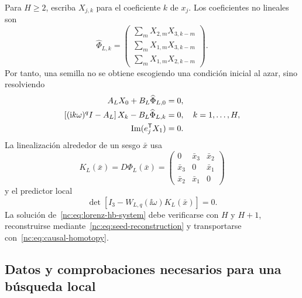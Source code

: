 Para \(H\geq2\), escriba \(X_{j,k}\) para el coeficiente \(k\) de \(x_j\).
Los coeficientes no lineales son
\begin{equation}
 \widehat\Phi_{L,k}=
 \begin{pmatrix}
 \displaystyle\sum_m X_{2,m}X_{3,k-m}\\[5pt]
 \displaystyle\sum_m X_{1,m}X_{3,k-m}\\[5pt]
 \displaystyle\sum_m X_{1,m}X_{2,k-m}
 \end{pmatrix}.
 \label{nc:eq:lorenz-fourier-phi}
\end{equation}
Por tanto, una semilla no se obtiene escogiendo una condición inicial al azar,
sino resolviendo
\begin{align}
 A_LX_0+B_L\widehat\Phi_{L,0}&=0,\\
 \left[(\mathrm{i} k\omega)^qI-A_L\right]X_k
 -B_L\widehat\Phi_{L,k}&=0,
 \quad k=1,\ldots,H,\\
 \operatorname{Im}(e_j^{\mathsf T} X_1)&=0.
 \label{nc:eq:lorenz-hb-system}
\end{align}
La linealización alrededor de un sesgo \(\bar x\) usa
\begin{equation}
 K_L(\bar x)=D\Phi_L(\bar x)=
 \begin{pmatrix}
 0&\bar x_3&\bar x_2\\
 \bar x_3&0&\bar x_1\\
 \bar x_2&\bar x_1&0
 \end{pmatrix}
 \label{nc:eq:lorenz-k}
\end{equation}
y el predictor local
\begin{equation}
 \det\left[I_3-W_{L,q}(\ii\omega)K_L(\bar x)\right]=0.
 \label{nc:eq:lorenz-local-closure}
\end{equation}
La solución de~\eqref{nc:eq:lorenz-hb-system} debe verificarse con \(H\) y
\(H+1\), reconstruirse mediante~\eqref{nc:eq:seed-reconstruction} y transportarse
con~\eqref{nc:eq:causal-homotopy}.

\subsection{Datos y comprobaciones necesarios para una búsqueda local}

